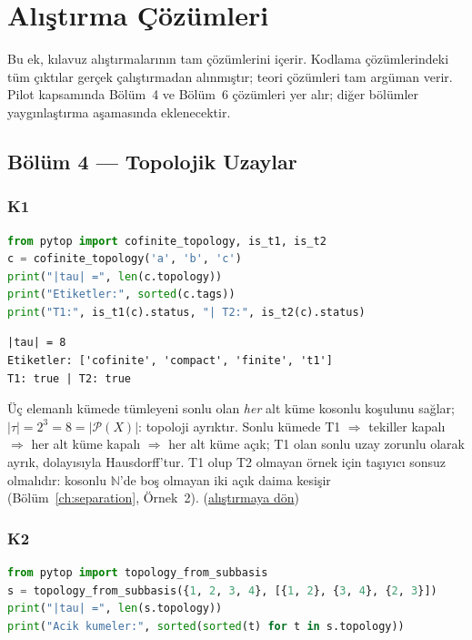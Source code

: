 \chapter{Alıştırma Çözümleri}
\label{app:solutions}

Bu ek, kılavuz alıştırmalarının tam çözümlerini içerir. Kodlama
çözümlerindeki tüm çıktılar gerçek çalıştırmadan alınmıştır; teori
çözümleri tam argüman verir. Pilot kapsamında Bölüm~4 ve Bölüm~6
çözümleri yer alır; diğer bölümler yaygınlaştırma aşamasında eklenecektir.

\section{Bölüm 4 --- Topolojik Uzaylar}

\subsection*{K1}\label{sol:ch04:K1}

\begin{lstlisting}[language=Python]
from pytop import cofinite_topology, is_t1, is_t2
c = cofinite_topology('a', 'b', 'c')
print("|tau| =", len(c.topology))
print("Etiketler:", sorted(c.tags))
print("T1:", is_t1(c).status, "| T2:", is_t2(c).status)
\end{lstlisting}

\begin{lstlisting}[style=output, caption={Çıktı}]
|tau| = 8
Etiketler: ['cofinite', 'compact', 'finite', 't1']
T1: true | T2: true
\end{lstlisting}

Üç elemanlı kümede tümleyeni sonlu olan \emph{her} alt küme kosonlu
koşulunu sağlar; $|\tau|=2^3=8=|\mathcal{P}(X)|$: topoloji ayrıktır.
Sonlu kümede T1 $\Rightarrow$ tekiller kapalı $\Rightarrow$ her alt
küme kapalı $\Rightarrow$ her alt küme açık; T1 olan sonlu uzay
zorunlu olarak ayrık, dolayısıyla Hausdorff'tur. T1 olup T2 olmayan
örnek için taşıyıcı sonsuz olmalıdır: kosonlu $\mathbb{N}$'de boş
olmayan iki açık daima kesişir (Bölüm~\ref{ch:separation}, Örnek~2).
\hfill(\hyperref[ex:ch04:K1]{alıştırmaya dön})

\subsection*{K2}\label{sol:ch04:K2}

\begin{lstlisting}[language=Python]
from pytop import topology_from_subbasis
s = topology_from_subbasis({1, 2, 3, 4}, [{1, 2}, {3, 4}, {2, 3}])
print("|tau| =", len(s.topology))
print("Acik kumeler:", sorted(sorted(t) for t in s.topology))
\end{lstlisting}

